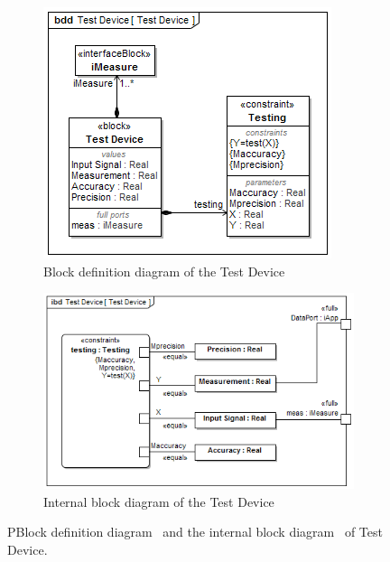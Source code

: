 \begin{figure}[ht]
	
	\centering
	
	\begin{subfigure}{.8\textwidth}
		\centering
		\includegraphics[width=.95\linewidth]{./chapter-sysml/diagrams/bdd__Test_Device__Test_Device}  
		\caption{Block definition diagram of the Test Device}
		\label{sysml:fig:testdevice:bdd}
	\end{subfigure}

	\begin{subfigure}{.8\textwidth}
		\centering
		\includegraphics[width=.95\linewidth]{./chapter-sysml/diagrams/ibd__Test_Device__Test_Device}  
		\caption{Internal block diagram of the Test Device}
		\label{sysml:fig:testdevice:ibd}
	\end{subfigure}

	\caption{PBlock definition diagram~\protect{} and the internal block diagram~\protect{} of Test Device.}
	\label{sysml:fig:testdevice:full}
	
\end{figure}

